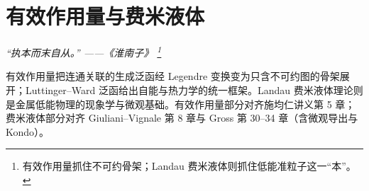 \chapter{有效作用量与费米液体}
\renewcommand{\currentchapterpath}{chapters/ch07/}

\begin{flushright}
\textit{“执本而末自从。” ——《淮南子》
\footnote{有效作用量抓住不可约骨架；Landau 费米液体则抓住低能准粒子这一“本”。}}
\end{flushright}

有效作用量把连通关联的生成泛函经 Legendre 变换变为只含不可约图的骨架展开；Luttinger--Ward 泛函给出自能与热力学的统一框架。Landau 费米液体理论则是金属低能物理的现象学与微观基础。有效作用量部分对齐施均仁讲义第 5 章；费米液体部分对齐 Giuliani--Vignale 第 8 章与 Gross 第 30--34 章（含微观导出与 Kondo）。


